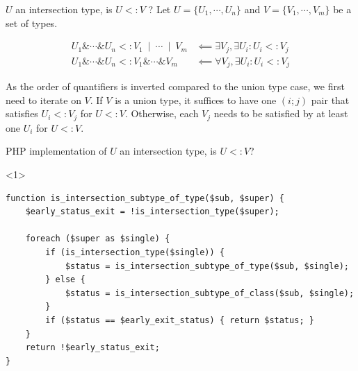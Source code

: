 \documentclass[aspectratio=169]{beamer}
\newcommand{\union}{\:\mathrel{|}\:}
\newcommand{\inter}{\mathrel{\&}}
\newcommand{\subtype}{\mathrel{<:}}
\begin{document}
\begin{frame}{$U$ an intersection type, is $U \subtype V$ ?}
    Let $U = \{U_1, \cdots, U_n\}$ and $V = \{V_1, \cdots, V_m\}$ be a set of types.

    \begin{align}
        U_1\inter\cdots\inter U_n \subtype V_1\union\cdots\union V_m & \impliedby \exists V_j, \exists U_i : U_i \subtype V_j \\
        U_1\inter\cdots\inter U_n \subtype V_1\inter\cdots\inter V_m & \impliedby \forall V_j, \exists U_i : U_i \subtype V_j  
    \end{align}

    As the \alert{order} of quantifiers is inverted compared to the union type case, we first need to iterate on $V$.
    If $V$ is a union type, it suffices to have one $(i;j)$ pair that satisfies $U_i \subtype V_j$ for $U \subtype V$.
    Otherwise, each $V_j$ needs to be satisfied by at least one $U_i$ for $U \subtype V$.
\end{frame}
\begin{frame}[fragile]{PHP implementation of $U$ an intersection type, is $U \subtype V$?}
    \begin{onlyenv}<1>
        \begin{verbatim}
function is_intersection_subtype_of_type($sub, $super) {
    $early_status_exit = !is_intersection_type($super);

    foreach ($super as $single) {
        if (is_intersection_type($single)) {
            $status = is_intersection_subtype_of_type($sub, $single);
        } else {
            $status = is_intersection_subtype_of_class($sub, $single);
        }
        if ($status == $early_exit_status) { return $status; }
    }
    return !$early_status_exit;
}
        \end{verbatim}
    \end{onlyenv}
\end{frame}
\end{document}

